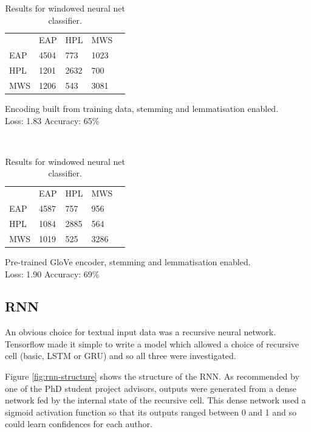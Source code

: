 \begin{table}[h]
\centering
\begin{subtable}{\columnwidth}
\centering
\begin{tabular}{m{1cm}|m{1cm}|m{1cm}|m{1cm}|m{0cm}}
\multicolumn{1}{m{1cm}}{} & \multicolumn{1}{m{1cm}}{EAP} & \multicolumn{1}{m{1cm}}{HPL} & \multicolumn{1}{m{1cm}}{MWS} &\\[5pt]
\cline{2-4}
EAP & 4504 & 773 & 1023 & \\[5pt]
\cline{2-4}
HPL & 1201 & 2632 & 700 & \\[5pt]
\cline{2-4}
MWS & 1206 & 543 & 3081 & \\[5pt]
\cline{2-4}
\end{tabular}
\caption{Encoding built from training data, stemming and lemmatisation enabled.\\Loss: 1.83 Accuracy: 65\%}
\end{subtable}\\
\vspace{1cm}
\begin{subtable}{\columnwidth}
\centering
\begin{tabular}{m{1cm}|m{1cm}|m{1cm}|m{1cm}|m{0cm}}
\multicolumn{1}{m{1cm}}{} & \multicolumn{1}{m{1cm}}{EAP} & \multicolumn{1}{m{1cm}}{HPL} & \multicolumn{1}{m{1cm}}{MWS} &\\[5pt]
\cline{2-4}
EAP & 4587 & 757 & 956 & \\[5pt]
\cline{2-4}
HPL & 1084 & 2885 & 564 & \\[5pt]
\cline{2-4}
MWS & 1019 & 525 & 3286 & \\[5pt]
\cline{2-4}
\end{tabular}
\caption{Pre-trained GloVe encoder, stemming and lemmatisation enabled.\\Loss: 1.90 Accuracy: 69\%}
\end{subtable}
\caption{Results for windowed neural net classifier.}
\label{tab:window_res}
\end{table}

\label{sec:dnn}

\subsection{RNN}
\label{sec:rnn}
  An obvious choice for textual input data was a recursive neural network.
  Tensorflow made it simple to write a model which allowed a choice of recursive
  cell (basic, LSTM or GRU) and so all three were investigated.  
  
  Figure \ref{fig:rnn-structure} shows the structure of the RNN. As recommended
  by one of the PhD student project advisors, outputs were generated from a
  dense network fed by the internal state of the recursive cell. This dense
  network used a sigmoid activation function so that its outputs ranged between
  0 and 1 and so could learn confidences for each author. 
  
